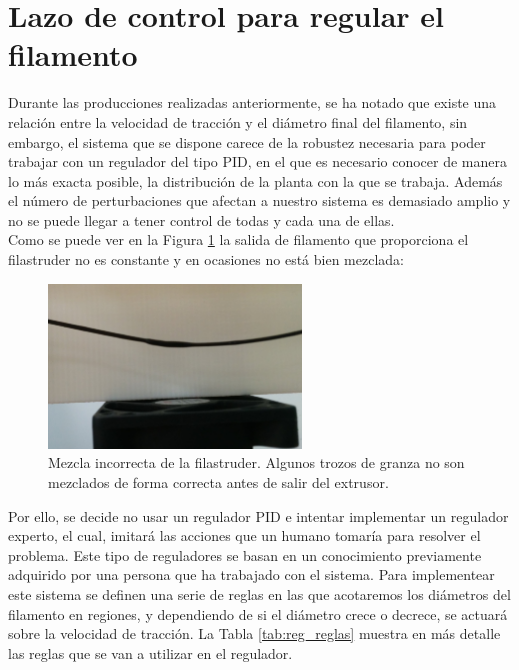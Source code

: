 \section{Lazo de control para regular el filamento}
\label{sec:reg_expt}

Durante las producciones realizadas anteriormente, se ha notado que existe una relación entre la velocidad de tracción y el diámetro final del filamento, sin embargo, el sistema que se dispone carece de la robustez necesaria para poder trabajar con un regulador del tipo PID, en el que es necesario conocer de manera lo más exacta posible, la distribución de la planta con la que se trabaja. Además el número de perturbaciones que afectan a nuestro sistema es demasiado amplio y no se puede llegar a tener control de todas y cada una de ellas.\\

Como se puede ver en la Figura \ref{fig:reg_mezcla} la salida de filamento que proporciona el filastruder no es constante y en ocasiones no está bien mezclada:

\begin{figure}[H]
    \centering
    \includegraphics[width=0.6\textwidth]{images/producciones/22072015/IMG_20150722_120959.jpg}
    \caption[Mezcla incorrecta de la filastruder.]{Mezcla incorrecta de la filastruder. Algunos trozos de granza no son mezclados de forma correcta antes de salir del extrusor.}
    \label{fig:reg_mezcla}
\end{figure}

Por ello, se decide no usar un regulador PID e intentar implementar un regulador experto, el cual, imitará las acciones que un humano tomaría para resolver el problema. Este tipo de reguladores se basan en un conocimiento previamente adquirido por una persona que ha trabajado con el sistema. Para implementear este sistema se definen una serie de reglas en las que acotaremos los diámetros del filamento en regiones, y dependiendo de si el diámetro crece o decrece, se actuará sobre la velocidad de tracción. La Tabla \ref{tab:reg_reglas} muestra en más detalle las reglas que se van a utilizar en el regulador.

